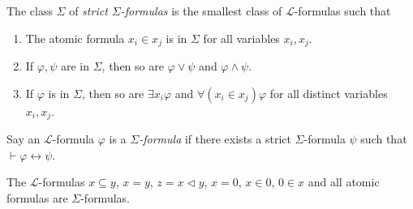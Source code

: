 \begin{definition}
\label{def:IsInSSigma}
\leanok
{}
The class $\Sigma$ of \textit{strict $\Sigma$-formulas} is the smallest class of 
$\mathcal{L}$-formulas such that
\begin{enumerate}
    \item The atomic formula $x_i \in x_j$ is in $\Sigma$ for all variables $x_i, x_j$.
    \item If $\varphi, \psi$ are in $\Sigma$, then so are 
        $\varphi \lor \psi$ and $\varphi \land \psi$.
    \item If $\varphi$ is in $\Sigma$, then so are $\exists x_i \varphi$ and 
        $\forall (x_i \in x_j) \varphi$ for all distinct variables $x_i, x_j$.
\end{enumerate}
\end{definition}

\begin{definition}
    \label{def:IsSigma}
    \leanok
    Say an $\mathcal{L}$-formula $\varphi$ is a \textit{$\Sigma$-formula} 
    if there exists a strict $\Sigma$-formula $\psi$ such that 
    $\vdash \varphi \leftrightarrow \psi$.
\end{definition}

\begin{lemma}
    \label{lem:subset_isSigma+...+empty_mem_isSigma}
    \leanok
    The $\mathcal{L}$-formulas $x \subseteq y$, $x = y$, $z = x \lhd y$, $x=0$, $x\in 0$,
    $0 \in x$ and all atomic formulas are $\Sigma$-formulas.
\end{lemma}

